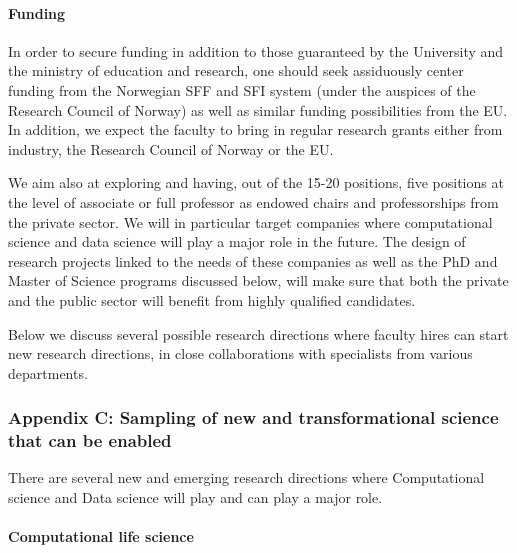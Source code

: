 \documentclass[]{article}
\let\oldparagraph\paragraph
\renewcommand{\paragraph}[1]{\oldparagraph{#1}\mbox{}}
\begin{document}
\hypertarget{funding}{%
\paragraph{Funding}\label{funding}}

In order to secure funding in addition to those guaranteed by the
University and the ministry of education and research, one should seek
assiduously center funding from the Norwegian SFF and SFI system (under
the auspices of the Research Council of Norway) as well as similar
funding possibilities from the EU. In addition, we expect the faculty to
bring in regular research grants either from industry, the Research
Council of Norway or the EU.

We aim also at exploring and having, out of the 15-20 positions, five
positions at the level of associate or full professor as endowed chairs
and professorships from the private sector. We will in particular target
companies where computational science and data science will play a major
role in the future. The design of research projects linked to the needs
of these companies as well as the PhD and Master of Science programs
discussed below, will make sure that both the private and the public
sector will benefit from highly qualified candidates.

Below we discuss several possible research directions where faculty
hires can start new research directions, in close collaborations with
specialists from various departments.

\hypertarget{appendix-c-sampling-of-new-and-transformational-science-that-can-be-enabled}{%
\subsubsection{Appendix C: Sampling of new and transformational science
that can be
enabled}\label{appendix-c-sampling-of-new-and-transformational-science-that-can-be-enabled}}

There are several new and emerging research directions where
Computational science and Data science will play and can play a major
role.

\hypertarget{computational-life-science}{%
\paragraph{Computational life
science}\label{computational-life-science}}
\end{document}
